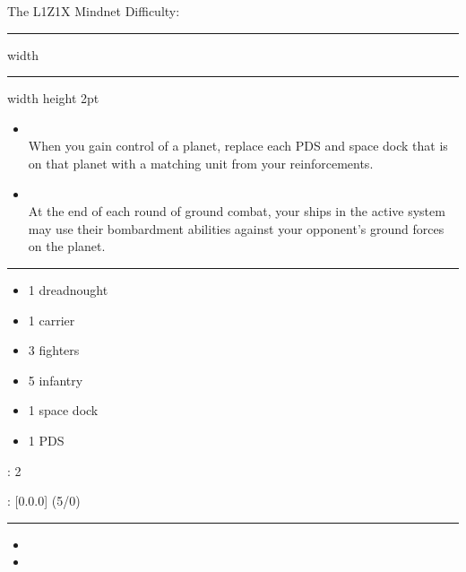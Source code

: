 {\handel\Huge The L1Z1X Mindnet} \hfill {\Large Difficulty: \easy} \vspace{-4pt}\\
\hrule width \hsize \kern 1mm \hrule width \hsize height 2pt


\begin{multicols}{2}


\begin{itemize}
\item {}\\
When you gain control of a planet, replace each PDS and space dock that is on that planet with a matching unit from your reinforcements.
\item {}\\
At the end of each round of ground combat, your ships in the active system may use their bombardment abilities against your opponent's ground forces on the planet.
\end{itemize}


\vspace{-10pt}\rule{\hsize}{0.4pt}\vspace{5pt}


\vspace{-5pt}
\begin{multicols}{2}
\begin{itemize}
\item 1 dreadnought
\item 1 carrier
\item 3 fighters
\item 5 infantry
\item 1 space dock
\item 1 PDS
\end{itemize}
\end{multicols}

\vspace{-5pt}
: 2

\vspace{2pt}
: [0.0.0] (5/0)

\rule{\hsize}{0.4pt}\vspace{5pt}


\begin{itemize}
\item \neural
\item \plasma
\end{itemize}


\end{multicols}
